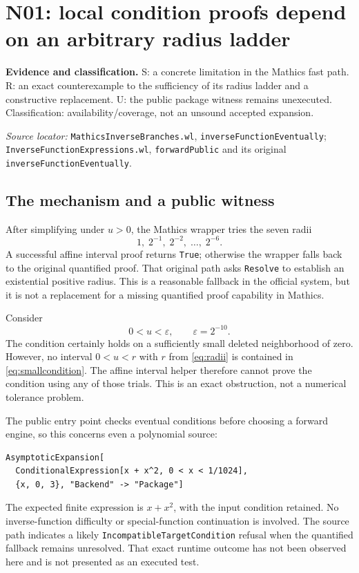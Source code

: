 \documentclass[11pt,letterpaper]{article}
\newcommand{\code}[1]{\nolinkurl{#1}}
\newcommand{\source}[1]{\par\textit{Source locator:} #1\par}
\newcommand{\status}[1]{\par\textbf{Evidence and classification.} #1\par}
\begin{document}
\section{N01: local condition proofs depend on an arbitrary radius ladder}
\label{sec:localproof}
\status{S: a concrete limitation in the Mathics fast path. R: an exact
counterexample to the sufficiency of its radius ladder and a constructive
replacement. U: the public package witness remains unexecuted. Classification:
availability/coverage, not an unsound accepted expansion.}
\source{\code{MathicsInverseBranches.wl}, \code{inverseFunctionEventually};
\code{InverseFunctionExpressions.wl}, \code{forwardPublic} and its original
\code{inverseFunctionEventually}. \cite{repo-mbranches,repo-iexpressions}}

\subsection{The mechanism and a public witness}
After simplifying under $u>0$, the Mathics wrapper tries the seven radii
\begin{equation}
 1,\;2^{-1},\;2^{-2},\;\ldots,\;2^{-6}.
 \label{eq:radii}
\end{equation}
A successful affine interval proof returns \code{True}; otherwise the wrapper
falls back to the original quantified proof. That original path asks
\code{Resolve} to establish an existential positive radius. This is a
reasonable fallback in the official system, but it is not a replacement for
a missing quantified proof capability in Mathics.

Consider
\begin{equation}
 0<u<\varepsilon,\qquad \varepsilon=2^{-10}.
 \label{eq:smallcondition}
\end{equation}
The condition certainly holds on a sufficiently small deleted neighborhood
of zero. However, no interval $0<u<r$ with $r$ from \eqref{eq:radii} is contained
in \eqref{eq:smallcondition}. The affine interval helper therefore cannot
prove the condition using any of those trials. This is an exact obstruction,
not a numerical tolerance problem.

The public entry point checks eventual conditions before choosing a forward
engine, so this concerns even a polynomial source:
\begin{lstlisting}
AsymptoticExpansion[
  ConditionalExpression[x + x^2, 0 < x < 1/1024],
  {x, 0, 3}, "Backend" -> "Package"]
\end{lstlisting}
The expected finite expression is $x+x^2$, with the input condition retained.
No inverse-function difficulty or special-function continuation is involved.
The source path indicates a likely \code{IncompatibleTargetCondition}
refusal when the quantified fallback remains unresolved. That exact runtime
outcome has not been observed here and is not presented as an executed test.
\end{document}
